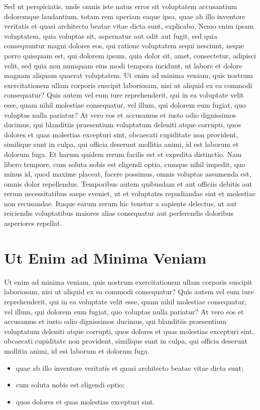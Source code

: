 Sed ut perspiciatis, unde omnis iste natus error sit voluptatem accusantium doloremque laudantium, totam rem aperiam eaque ipsa, quae ab illo inventore veritatis et quasi architecto beatae vitae dicta sunt, explicabo. Nemo enim ipsam voluptatem, quia voluptas sit, aspernatur aut odit aut fugit, sed quia consequuntur magni dolores eos, qui ratione voluptatem sequi nesciunt, neque porro quisquam est, qui dolorem ipsum, quia dolor sit, amet, consectetur, adipisci velit, sed quia non numquam eius modi tempora incidunt, ut labore et dolore magnam aliquam quaerat voluptatem. Ut enim ad minima veniam, quis nostrum exercitationem ullam corporis suscipit laboriosam, nisi ut aliquid ex ea commodi consequatur? Quis autem vel eum iure reprehenderit, qui in ea voluptate velit esse, quam nihil molestiae consequatur, vel illum, qui dolorem eum fugiat, quo voluptas nulla pariatur? At vero eos et accusamus et iusto odio dignissimos ducimus, qui blanditiis praesentium voluptatum deleniti atque corrupti, quos dolores et quas molestias excepturi sint, obcaecati cupiditate non provident, similique sunt in culpa, qui officia deserunt mollitia animi, id est laborum et dolorum fuga. Et harum quidem rerum facilis est et expedita distinctio. Nam libero tempore, cum soluta nobis est eligendi optio, cumque nihil impedit, quo minus id, quod maxime placeat, facere possimus, omnis voluptas assumenda est, omnis dolor repellendus. Temporibus autem quibusdam et aut officiis debitis aut rerum necessitatibus saepe eveniet, ut et voluptates repudiandae sint et molestiae non recusandae. Itaque earum rerum hic tenetur a sapiente delectus, ut aut reiciendis voluptatibus maiores alias consequatur aut perferendis doloribus asperiores repellat.

\section{Ut Enim ad Minima Veniam}

Ut enim ad minima veniam, quis nostrum exercitationem ullam corporis suscipit laboriosam, nisi ut aliquid ex ea commodi consequatur? Quis autem vel eum iure reprehenderit, qui in ea voluptate velit esse, quam nihil molestiae consequatur, vel illum, qui dolorem eum fugiat, quo voluptas nulla pariatur? At vero eos et accusamus et iusto odio dignissimos ducimus, qui blanditiis praesentium voluptatum deleniti atque corrupti, quos dolores et quas molestias excepturi sint, obcaecati cupiditate non provident, similique sunt in culpa, qui officia deserunt mollitia animi, id est laborum et dolorum fuga.
\begin{itemize}
\item quae ab illo inventore veritatis et quasi architecto beatae vitae dicta sunt;
\item cum soluta nobis est eligendi optio;
\item quos dolores et quas molestias excepturi sint.
\end{itemize}

